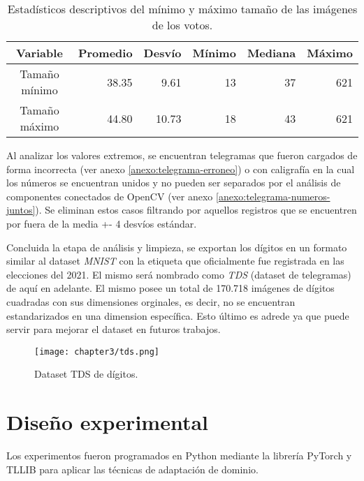 \begin{table}[H]
    \centering
    \begin{tabular}{crrrrr}
        \toprule
        Variable            & Promedio & Desv\'io & M\'inimo & Mediana & M\'aximo \\
        \midrule
        Tama\~{n}o m\'inimo & 38.35    & 9.61     & 13       & 37      & 621      \\
        Tama\~{n}o m\'aximo & 44.80    & 10.73    & 18       & 43      & 621      \\
        \bottomrule
    \end{tabular}
    \caption{Estad\'isticos descriptivos del m\'inimo y m\'aximo tama\~{n}o de las im\'agenes de los votos.}
    \label{tab:describe-min-max-size}
\end{table}

Al analizar los valores extremos, se encuentran telegramas que fueron cargados de forma incorrecta (ver anexo
\ref{anexo:telegrama-erroneo}) o con caligraf\'ia en la cual los n\'umeros se encuentran unidos y no pueden ser
separados por el an\'alisis de componentes conectados de OpenCV (ver anexo \ref{anexo:telegrama-numeros-juntos}). Se
eliminan estos casos filtrando por aquellos registros que se encuentren por fuera de la media +- 4 desv\'ios
est\'andar.

Concluida la etapa de an\'alisis y limpieza, se exportan los d\'igitos en un formato similar al dataset {\it MNIST} con
la etiqueta que oficialmente fue registrada en las elecciones del 2021. El mismo ser\'a nombrado como {\it TDS}
(dataset de telegramas) de aqu\'i en adelante. El mismo posee un total de 170.718 im\'agenes de d\'igitos cuadradas con
sus dimensiones orginales, es decir, no se encuentran estandarizados en una dimension espec\'ifica. Esto \'ultimo es
adrede ya que puede servir para mejorar el dataset en futuros trabajos.

\begin{figure}[H]
    \centering
    \texttt{[image: chapter3/tds.png]}
    \caption{Dataset TDS de d\'igitos.}
    \label{fig:tds}
\end{figure}

\section{Dise\~{n}o experimental}

Los experimentos fueron programados en Python mediante la librer\'ia PyTorch \parencite{NEURIPS2019_9015} y TLLIB \parencite{tllib} para aplicar las t\'ecnicas de adaptaci\'on de dominio.

